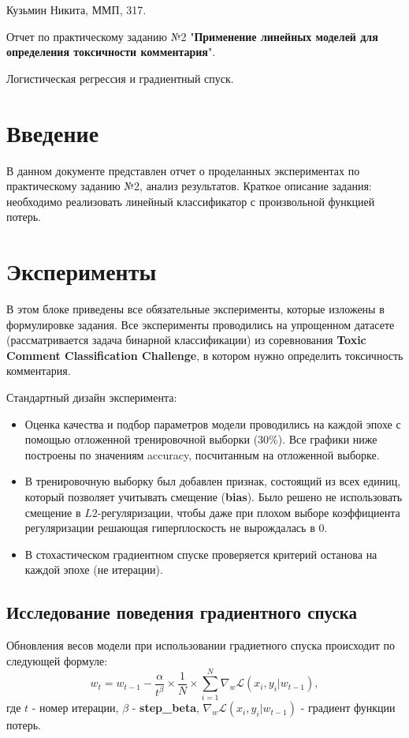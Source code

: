 \documentclass[a4paper, 11pt]{article}
\begin{document}
    \hfill Кузьмин Никита, ММП, 317.
    
    \begin{center} \Large Отчет по практическому заданию №2 "\textbf{Применение линейных моделей для определения токсичности комментария}". 
    
    Логистическая регрессия и градиентный спуск.
    \tableofcontents
    \end{center}
    
    \newpage
    \section{Введение}
    
    В данном документе представлен отчет о проделанных экспериментах по практическому заданию №2, анализ результатов. 
    Краткое описание задания: необходимо реализовать линейный классификатор с произвольной функцией потерь.
    
    \section{Эксперименты}
    В этом блоке приведены все обязательные эксперименты, которые изложены в формулировке задания.
    Все эксперименты проводились на упрощенном датасете (рассматривается задача бинарной классификации) из соревнования \textbf{Toxic Comment Classification Challenge}, в котором нужно определить токсичность комментария. 
    
    Стандартный дизайн эксперимента: 
    \begin{itemize}
        \item Оценка качества и подбор параметров модели проводились на каждой эпохе с помощью отложенной тренировочной выборки (30\%). Все графики ниже построены по значениям accuracy, посчитанным на отложенной выборке.
        \item В тренировочную выборку был добавлен признак, состоящий из всех единиц, который позволяет учитывать смещение (\textbf{bias}). Было решено не использовать смещение в $L2$-регуляризации, чтобы даже при плохом выборе коэффициента регуляризации решающая гиперплоскость не вырождалась в 0.
        \item В стохастическом градиентном спуске проверяется критерий останова на каждой эпохе (не итерации).
    \end{itemize}

        \subsection{Исследование поведения градиентного спуска}
            Обновления весов модели при использовании градиетного спуска происходит по следующей формуле:
            \begin{equation}\label{exp1:weight_upd}
            w_t = w_{t-1} - \frac{\alpha}{t^\beta} \times \frac{1}{N} \times \sum_{i=1}^{N}\nabla_{w}\mathcal{L}(x_i, y_i|w_{t-1}),
            \end{equation}
            где $t$ - номер итерации, $\beta$ - \textbf{step\_beta}, $\nabla_{w}\mathcal{L}(x_i, y_i|w_{t-1})$ - градиент функции потерь.
\end{document}
